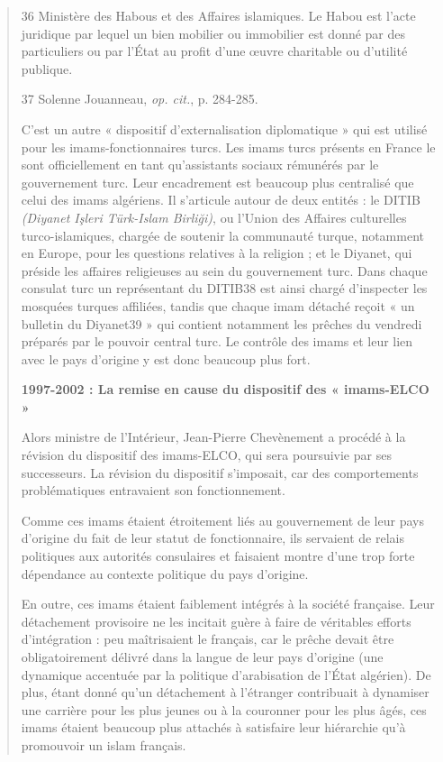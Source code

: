 \begin{quote}
36 Ministère des Habous et des Affaires islamiques. Le Habou est l'acte
juridique par lequel un bien mobilier ou immobilier est donné par des
particuliers ou par l'État au profit d'une œuvre charitable ou d'utilité
publique.

37 Solenne Jouanneau, \emph{op. cit.}, p. 284-285.



C'est un autre « dispositif d'externalisation diplomatique » qui est
utilisé pour les imams-fonctionnaires turcs. Les imams turcs présents en
France le sont officiellement en tant qu'assistants sociaux rémunérés
par le gouvernement turc. Leur encadrement est beaucoup plus centralisé
que celui des imams algériens. Il s'articule autour de deux entités : le
DITIB \emph{(Diyanet Işleri Türk-Islam Birliği)}, ou l'Union des
Affaires culturelles turco-islamiques, chargée de soutenir la communauté
turque, notamment en Europe, pour les questions relatives à la religion
; et le Diyanet, qui préside les affaires religieuses au sein du
gouvernement turc. Dans chaque consulat turc un représentant du DITIB38
est ainsi chargé d'inspecter les mosquées turques affiliées, tandis que
chaque imam détaché reçoit « un bulletin du Diyanet39 » qui contient
notamment les prêches du vendredi préparés par le pouvoir central turc.
Le contrôle des imams et leur lien avec le pays d'origine y est donc
beaucoup plus fort.

\textbf{1997-2002 : La remise en cause du dispositif des « imams-ELCO »}

Alors ministre de l'Intérieur, Jean-Pierre Chevènement a procédé à la
révision du dispositif des imams-ELCO, qui sera poursuivie par ses
successeurs. La révision du dispositif s'imposait, car des comportements
problématiques entravaient son fonctionnement.

Comme ces imams étaient étroitement liés au gouvernement de leur pays
d'origine du fait de leur statut de fonctionnaire, ils servaient de
relais politiques aux autorités consulaires et faisaient montre d'une
trop forte dépendance au contexte politique du pays d'origine.

En outre, ces imams étaient faiblement intégrés à la société française.
Leur détachement provisoire ne les incitait guère à faire de véritables
efforts d'intégration : peu maîtrisaient le français, car le prêche
devait être obligatoirement délivré dans la langue de leur pays
d'origine (une dynamique accentuée par la politique d'arabisation de
l'État algérien). De plus, étant donné qu'un détachement à l'étranger
contribuait à dynamiser une carrière pour les plus jeunes ou à la
couronner pour les plus âgés, ces imams étaient beaucoup plus attachés à
satisfaire leur hiérarchie qu'à promouvoir un islam français.


\end{quote}
